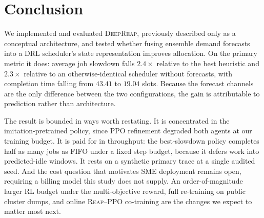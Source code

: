 \documentclass[runningheads]{llncs}
\newcommand{\reap}{\textsc{Reap}}
\newcommand{\deepreap}{\textsc{DeepReap}}
\begin{document}
\section{Conclusion}
We implemented and evaluated \deepreap{}, previously described only as
a conceptual architecture, and tested whether fusing ensemble demand
forecasts into a DRL scheduler's state representation improves
allocation. On the primary metric it does: average job slowdown falls
$2.4\times$ relative to the best heuristic and $2.3\times$ relative to
an otherwise-identical scheduler without forecasts, with completion
time falling from $43.41$ to $19.04$ slots. Because the forecast
channels are the only difference between the two configurations, the
gain is attributable to prediction rather than architecture.

The result is bounded in ways worth restating. It is concentrated in
the imitation-pretrained policy, since PPO refinement degraded both
agents at our training budget. It is paid for in throughput: the
best-slowdown policy completes half as many jobs as FIFO under a fixed
step budget, because it defers work into predicted-idle windows. It
rests on a synthetic primary trace at a single audited seed. And the
cost question that motivates SME deployment remains open, requiring a
billing model this study does not supply. An order-of-magnitude larger
RL budget under the multi-objective reward, full re-training on public
cluster dumps, and online \reap{}--PPO co-training are the changes we
expect to matter most next.
\end{document}
